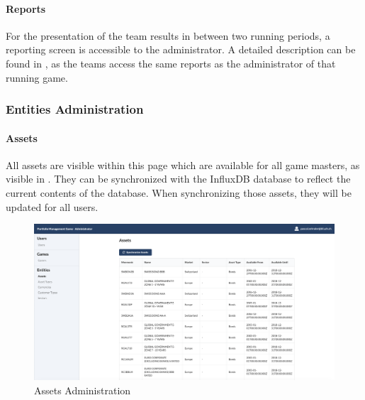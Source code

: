 \paragraph{Reports}
For the presentation of the team results in between two running periods, a reporting screen is accessible to the administrator. A detailed description can be found in , as the teams access the same reports as the administrator of that running game.


\subsubsection{Entities Administration}

\paragraph{Assets}
All assets are visible within this page which are available for all game masters, as visible in . They can be synchronized with the InfluxDB database to reflect the current contents of the database. When synchronizing those assets, they will be updated for all users.
\begin{figure}[h!]
  \centering
  \includegraphics[scale=0.2]{img/application-overview/administrator/entities_assets.png}
  \caption{Assets Administration}
  \label{fig:assets}
\end{figure}


